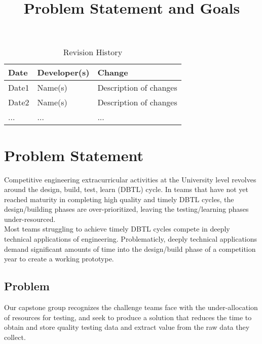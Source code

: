 \documentclass{article}
\title{Problem Statement and Goals\\\progname}
\author{\authname}
\date{}
\begin{document}
\maketitle

\begin{table}[hp]
\caption{Revision History} \label{TblRevisionHistory}
\begin{tabularx}{\textwidth}{llX}
\toprule
\textbf{Date} & \textbf{Developer(s)} & \textbf{Change}\\
\midrule
Date1 & Name(s) & Description of changes\\
Date2 & Name(s) & Description of changes\\
... & ... & ...\\
\bottomrule
\end{tabularx}
\end{table}

\section{Problem Statement}


Competitive engineering extracurricular activities at the University level revolves around the design, build, test, learn (DBTL) cycle. In teams that have not yet reached maturity in completing high quality and timely DBTL cycles, the design/building phases are over-prioritized, leaving the testing/learning phases under-resourced.     \\

Most teams struggling to achieve timely DBTL cycles compete in deeply technical applications of engineering. Problematicly, deeply technical applications demand significant amounts of time into the design/build phase of a competition year to create a working prototype. \newpage

\subsection{Problem}

Our capstone group recognizes the challenge teams face with the under-allocation of resources for testing, and seek to produce a solution that reduces the time to obtain and store quality testing data and extract value from the raw data they collect. \\ 
\end{document}
